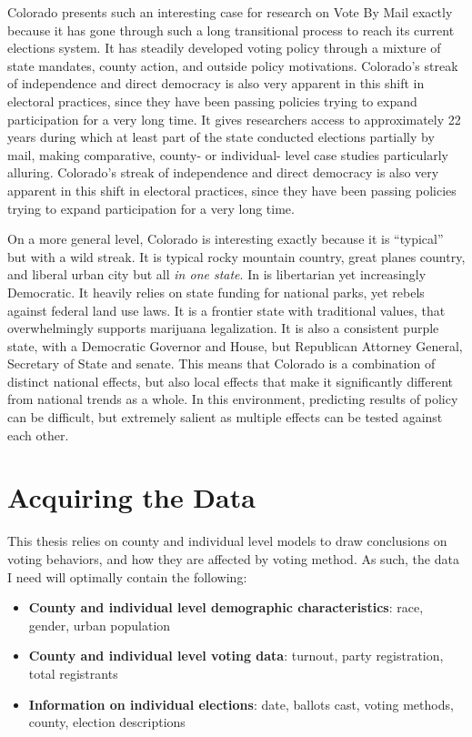 \documentclass[12pt,twoside]{reedthesis}
\begin{document}
  Colorado presents such an interesting case for research on Vote By Mail
  exactly because it has gone through such a long transitional process to
  reach its current elections system. It has steadily developed voting
  policy through a mixture of state mandates, county action, and outside
  policy motivations. Colorado's streak of independence and direct
  democracy is also very apparent in this shift in electoral practices,
  since they have been passing policies trying to expand participation for
  a very long time. It gives researchers access to approximately 22 years
  during which at least part of the state conducted elections partially by
  mail, making comparative, county- or individual- level case studies
  particularly alluring. Colorado's streak of independence and direct
  democracy is also very apparent in this shift in electoral practices,
  since they have been passing policies trying to expand participation for
  a very long time.
  
  On a more general level, Colorado is interesting exactly because it is
  ``typical'' but with a wild streak. It is typical rocky mountain
  country, great planes country, and liberal urban city but all \emph{in
  one state}. In is libertarian yet increasingly Democratic. It heavily
  relies on state funding for national parks, yet rebels against federal
  land use laws. It is a frontier state with traditional values, that
  overwhelmingly supports marijuana legalization. It is also a consistent
  purple state, with a Democratic Governor and House, but Republican
  Attorney General, Secretary of State and senate. This means that
  Colorado is a combination of distinct national effects, but also local
  effects that make it significantly different from national trends as a
  whole. In this environment, predicting results of policy can be
  difficult, but extremely salient as multiple effects can be tested
  against each other.
  
  \section{Acquiring the Data}\label{acquiring-the-data}
  
  This thesis relies on county and individual level models to draw
  conclusions on voting behaviors, and how they are affected by voting
  method. As such, the data I need will optimally contain the following:
  
  \begin{itemize}
  \item
    \textbf{County and individual level demographic characteristics}:
    race, gender, urban population
  \item
    \textbf{County and individual level voting data}: turnout, party
    registration, total registrants
  \item
    \textbf{Information on individual elections}: date, ballots cast,
    voting methods, county, election descriptions
  \end{itemize}
  
\end{document}
